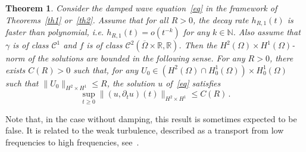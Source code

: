 \documentclass[10pt]{amsart}
\newtheorem{theo}{Theorem}[section]
\theoremstyle{definition}\newtheorem{defi}[theo]{Definition}\newtheorem{rema}[theo]{Remark}\newtheorem{exam}[theo]{Example}\newtheorem{exem}[theo]{Example}\newtheorem{nota}[theo]{Notation}
\newcommand{\RR}{\mathbb{R}}
\newcommand{\NN}{\mathbb{N}}
\newcommand{\Cc}{\mathcal{C}}
\begin{document}
\begin{theo}\label{th-norm-H2}
Consider the damped wave equation~\eqref{eq} in the framework of Theorems~\ref{th1} or~\ref{th2}. Assume that for all $R>0$, the decay rate $h_{R,1}(t)$ is faster than polynomial, i.e. $h_{R,1}(t)=o(t^{-k})$ for any $k\in\NN$. Also assume that $\gamma$ is of class $\Cc^1$ and $f$ is of class $\Cc^2(\overline\Omega\times \RR,\RR)$. Then the $H^2(\Omega)\times H^1(\Omega)$-norm of the solutions are bounded in the following sense. For any $R>0$, there exists $C(R)>0$ such that, for any $U_0\in (H^{2}(\Omega)\cap H^1_0(\Omega))\times H^1_0(\Omega)$ such that $\|U_0\|_{H^2\times H^1} \leq R$, the solution $u$ of~\eqref{eq} satisfies
\[
\sup_{t\geq 0} \|(u,\partial_t u)(t)\|_{H^2\times H^1} \leq C(R)\,.
\]
\end{theo}

Note that, in the case without damping, this result is sometimes expected to be false. It is related to the weak turbulence, described as a transport from low frequencies to high frequencies, see~\cite{Colliander,Gerard-Grellier,Hani}.


\end{document}
